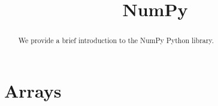 \documentclass{ximera}
\title{NumPy}
\begin{document}
\begin{abstract}
	We provide a brief introduction to the NumPy Python library.
\end{abstract}
\maketitle

\section{Arrays}
\end{document}
